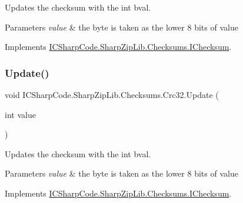 Updates the checksum with the int bval. 


\begin{DoxyParams}{Parameters}
{\em value} & the byte is taken as the lower 8 bits of value \\
\hline
\end{DoxyParams}


Implements \hyperlink{interface_i_c_sharp_code_1_1_sharp_zip_lib_1_1_checksums_1_1_i_checksum_a060abf360d877d0d9cf503fa6d6873d0}{I\+C\+Sharp\+Code.\+Sharp\+Zip\+Lib.\+Checksums.\+I\+Checksum}.

\mbox{\label{class_i_c_sharp_code_1_1_sharp_zip_lib_1_1_checksums_1_1_crc32_a7f5626219875b0291d1f54e5a7bdbeaa}} 
\subsubsection{\texorpdfstring{Update()}{Update()}\hspace{0.1cm}{\footnotesize\ttfamily [2/6]}}
{\footnotesize\ttfamily void I\+C\+Sharp\+Code.\+Sharp\+Zip\+Lib.\+Checksums.\+Crc32.\+Update (\begin{DoxyParamCaption}\item[{int}]{value }\end{DoxyParamCaption})\hspace{0.3cm}{\ttfamily [inline]}}



Updates the checksum with the int bval. 


\begin{DoxyParams}{Parameters}
{\em value} & the byte is taken as the lower 8 bits of value \\
\hline
\end{DoxyParams}


Implements \hyperlink{interface_i_c_sharp_code_1_1_sharp_zip_lib_1_1_checksums_1_1_i_checksum_a060abf360d877d0d9cf503fa6d6873d0}{I\+C\+Sharp\+Code.\+Sharp\+Zip\+Lib.\+Checksums.\+I\+Checksum}.

\mbox{\label{class_i_c_sharp_code_1_1_sharp_zip_lib_1_1_checksums_1_1_crc32_aed937de570263627f41641aea63e399f}} 
